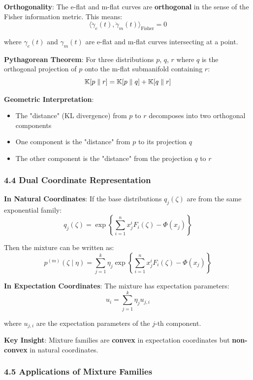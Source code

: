\documentclass{amsart}
\let\originalmathbb\mathbb
\renewcommand{\mathbb}[1]{%
    \ifstrequal{#1}{1}{\mathbbm{#1}}{\originalmathbb{#1}}%
}
\theoremstyle{plain}
\theoremstyle{definition}
\theoremstyle{remark}
\begin{document}
\textbf{Orthogonality}:
The e-flat and m-flat curves are \textbf{orthogonal} in the sense of the Fisher information metric. This means:
\[
\langle \dot{\gamma}_e(t), \dot{\gamma}_m(t) \rangle_{\text{Fisher}} = 0
\]

where $\gamma_e(t)$ and $\gamma_m(t)$ are e-flat and m-flat curves intersecting at a point.

\textbf{Pythagorean Theorem}:
For three distributions $p$, $q$, $r$ where $q$ is the orthogonal projection of $p$ onto the m-flat submanifold containing $r$:
\[
\mathbb{K}[p \parallel r] = \mathbb{K}[p \parallel q] + \mathbb{K}[q \parallel r]
\]

\textbf{Geometric Interpretation}:

\begin{itemize}
	\item The "distance" (KL divergence) from $p$ to $r$ decomposes into two orthogonal components
	\item One component is the "distance" from $p$ to its projection $q$
	\item The other component is the "distance" from the projection $q$ to $r$
\end{itemize}

\subsubsection{4.4 Dual Coordinate Representation}

\textbf{In Natural Coordinates}:
If the base distributions $q_j(\zeta)$ are from the same exponential family:
\[
q_j(\zeta) = \exp\left\{\sum_{i=1}^n x_j^i F_i(\zeta) - \Phi(x_j)\right\}
\]

Then the mixture can be written as:
\[
p^{(m)}(\zeta \mid \eta) = \sum_{j=1}^k \eta_j \exp\left\{\sum_{i=1}^n x_j^i F_i(\zeta) - \Phi(x_j)\right\}
\]

\textbf{In Expectation Coordinates}:
The mixture has expectation parameters:
\[
u_i = \sum_{j=1}^k \eta_j u_{j,i}
\]

where $u_{j,i}$ are the expectation parameters of the $j$-th component.

\textbf{Key Insight}: Mixture families are \textbf{convex} in expectation coordinates but \textbf{non-convex} in natural coordinates.

\subsubsection{4.5 Applications of Mixture Families}
\end{document}
